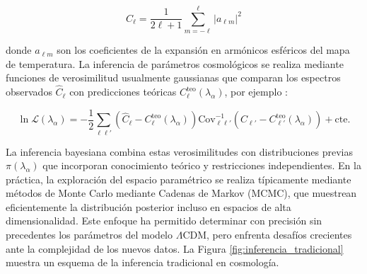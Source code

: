 \begin{equation}
C_\ell = \frac{1}{2\ell + 1} \sum_{m=-\ell}^\ell |a_{\ell m}|^2
\end{equation}

donde $a_{\ell m}$ son los coeficientes de la expansión en armónicos esféricos del mapa de temperatura. La inferencia de parámetros cosmológicos se realiza mediante funciones de verosimilitud usualmente gaussianas que comparan los espectros observados $\hat{C}_\ell$ con predicciones teóricas $C_\ell^{\text{teo}}(\lambda_\alpha)$, por ejemplo \cite{dodelson}:

\begin{equation}
\ln \mathcal{L}(\lambda_\alpha) = -\frac{1}{2} \sum_{\ell\ell'} \left( \hat{C}_\ell - C_\ell^{\text{teo}}(\lambda_\alpha) \right) \text{Cov}^{-1}_{\ell\ell'} \left( \hat{C}_{\ell'} - C_{\ell'}^{\text{teo}}(\lambda_\alpha) \right) + \text{cte.}
\end{equation}

La inferencia bayesiana combina estas verosimilitudes con distribuciones previas $\pi(\lambda_\alpha)$ que incorporan conocimiento teórico y restricciones independientes. En la práctica, la exploración del espacio paramétrico se realiza típicamente mediante métodos de Monte Carlo mediante Cadenas de Markov (MCMC), que muestrean eficientemente la distribución posterior incluso en espacios de alta dimensionalidad. Este enfoque ha permitido determinar con precisión sin precedentes los parámetros del modelo $\Lambda$CDM, pero enfrenta desafíos crecientes ante la complejidad de los nuevos datos. La Figura \ref{fig:inferencia_tradicional} muestra un esquema de la inferencia tradicional en cosmología.

